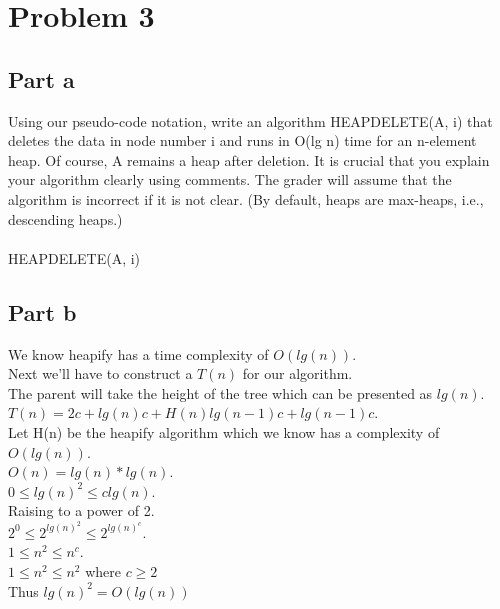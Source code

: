 \documentclass{article}
\begin{document}
\section*{Problem 3}
\subsection*{Part a}

Using our pseudo-code notation, write an algorithm HEAPDELETE(A, i) that
deletes the data in node number i and runs in O(lg n) time for an n-element
heap. Of course, A remains a heap after deletion.
It is crucial that you explain your algorithm clearly using comments. The grader
will assume that the algorithm is incorrect if it is not clear.
(By default, heaps are max-heaps, i.e., descending heaps.)\\\\

HEAPDELETE(A, i)
\begin{algorithmic}[1]
     
     
     
         
         
\end{algorithmic}

\subsection*{Part b}
We know heapify has a time complexity of $O(lg(n))$.\\
Next we'll have to construct a $T(n)$ for our algorithm.\\
The parent will take the height of the tree which can be 
presented as $lg(n)$.\\
$T(n) = 2c + lg(n)c + H(n)lg(n - 1)c + lg(n - 1)c$.\\
Let H(n) be the heapify algorithm which we know has a complexity 
of $O(lg(n))$.\\
$O(n) = lg(n)*lg(n)$.\\
$0 \le lg(n)^{2} \le clg(n)$.\\
Raising to a power of 2.\\
$2^{0} \le 2^{lg(n)^{2}} \le 2^{lg(n)^{c}}$.\\
$1 \le n^{2} \le n^{c}$.\\
$1 \le n^{2} \le n^{2}$ where $c \ge 2$\\
Thus $lg(n)^{2} = O(lg(n))$\\
\end{document}
